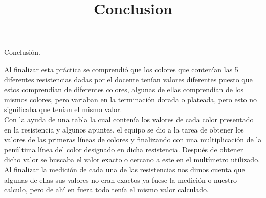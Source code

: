 \documentclass[12pt,a4paper]{report}
\title{Conclusion}
\begin{document}
	\begin{center}
		\begin{Large}
			Conclusi\'on.\\
			\vspace{1.5cm}
		\end{Large}
	\end{center}
\begin{flushleft}
	Al finalizar esta práctica se comprendió que los colores que contenían las 5 diferentes resistencias dadas por el docente tenían valores diferentes puesto que estos comprendían de diferentes colores, algunas de ellas comprendían de los mismos colores, pero variaban en la terminación dorada o plateada, pero esto no significaba que tenían el mismo valor.\\
	\vspace*{0.5cm}
	Con la ayuda de una tabla la cual contenía los valores de cada color presentado en la resistencia y algunos apuntes, el equipo se dio a la tarea de obtener los valores de las primeras líneas de colores y finalizando con una multiplicación de la penúltima línea del color designado en dicha resistencia. Después de obtener dicho valor se buscaba el valor exacto o cercano a este en el multímetro utilizado.\\
	\vspace*{0.5cm}
	Al finalizar la medición de cada una de las resistencias nos dimos cuenta que algunas de ellas sus valores no eran exactos ya fuese la medición o nuestro calculo, pero de ahí en fuera todo tenía el mismo valor calculado.
\end{flushleft}
	
\end{document}
